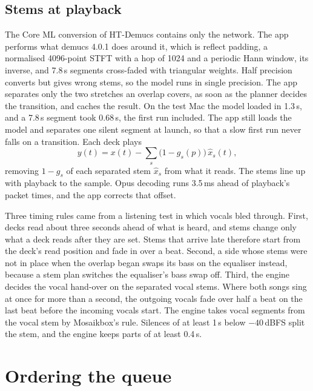 \documentclass[conference,a4paper]{IEEEtran}
\begin{document}
\subsection{Stems at playback}
The Core ML conversion of HT-Demucs \cite{htdemucs} contains only the network. The app performs
what demucs 4.0.1 does around it, which is reflect padding, a normalised 4096-point STFT with a hop
of 1024 and a periodic Hann window, its inverse, and 7.8\,s segments cross-faded with triangular
weights. Half precision converts but gives wrong stems, so the model runs in single precision. The
app separates only the two stretches an overlap covers, as soon as the planner decides the
transition, and caches the result. On the test Mac the model loaded in 1.3\,s, and a 7.8\,s segment
took 0.68\,s, the first run included. The app still loads the model and separates one silent segment
at launch, so that a slow first run never falls on a transition. Each deck plays
\begin{equation}
y(t)=x(t)-\sum_{s}\bigl(1-g_s(p)\bigr)\,\hat{x}_s(t),
\end{equation}
removing $1-g_s$ of each separated stem $\hat{x}_s$ from what it reads. The stems line up with
playback to the sample. Opus decoding runs 3.5\,ms ahead of playback's packet times, and the app
corrects that offset.

Three timing rules came from a listening test in which vocals bled through. First, decks read about
three seconds ahead of what is heard, and stems change only what a deck reads after they are set.
Stems that arrive late therefore start from the deck's read position and fade in over a beat.
Second, a side whose stems were not in place when the overlap began swaps its bass on the equaliser
instead, because a stem plan switches the equaliser's bass swap off. Third, the engine decides the
vocal hand-over on the separated vocal stems. Where both songs sing at once for more than a second,
the outgoing vocals fade over half a beat on the last beat before the incoming vocals start. The
engine takes vocal segments from the vocal stem by Mosaikbox's rule. Silences of at least 1\,s
below $-40$\,dBFS split the stem, and the engine keeps parts of at least 0.4\,s.

\section{Ordering the queue}\label{sec:sequencer}
\end{document}
